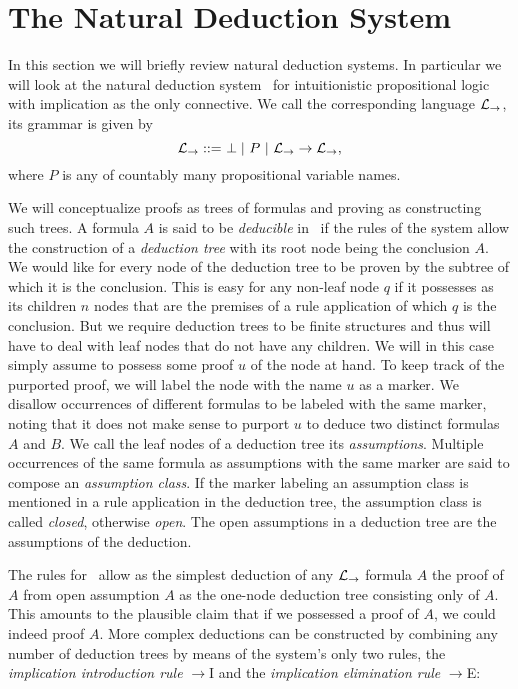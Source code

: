 \section{The Natural Deduction System \implnpi}
\label{sec:naturaldeduction}


In this section we will briefly review natural deduction systems. In particular
we will look at the natural deduction system \implnpi\ for intuitionistic
propositional logic with implication as the only connective. We call the
corresponding language $\mathcal{L}_\to$, its grammar is given by
$$\mathcal{L}_\to ::=\ \perp |\ P\ |\ \mathcal{L}_\to \to \mathcal{L}_\to,$$
where $P$ is any of countably many propositional variable names.

We will conceptualize proofs as trees of formulas and proving as constructing
such trees. A formula $A$ is said to be \textit{deducible} in \implnpi\ if the
rules of the system allow the construction of a \textit{deduction tree} with its
root node being the conclusion $A$. We would like for every node of the
deduction tree to be proven by the subtree of which it is the conclusion. This
is easy for any non-leaf node $q$ if it possesses as its children $n$ nodes that
are the premises of a rule application of which $q$ is the conclusion. But we
require deduction trees to be finite structures and thus will have to deal with
leaf nodes that do not have any children. We will in this case simply assume to
possess some proof $u$ of the node at hand. To keep track of the purported
proof, we will label the node with the name $u$ as a marker. We disallow
occurrences of different formulas to be labeled with the same marker, noting
that it does not make sense to purport $u$ to deduce two distinct formulas $A$
and $B$. We call the leaf nodes of a deduction tree its \textit{assumptions}.
Multiple occurrences of the same formula as assumptions with the same marker are
said to compose an \textit{assumption class}. If the marker labeling an
assumption class is mentioned in a rule application in the deduction tree, the
assumption class is called \textit{closed}, otherwise \textit{open}. The open
assumptions in a deduction tree are the assumptions of the deduction.

The rules for \implnpi\ allow as the simplest deduction of any $\mathcal{L}_\to$ formula
$A$ the proof of $A$ from open assumption $A$ as the one-node deduction tree
consisting only of $A$. This amounts to the plausible claim that if we possessed
a proof of $A$, we could indeed proof $A$. More complex deductions can be
constructed by combining any number of deduction trees by means of the system's
only two rules, the \textit{implication introduction rule} $\to$I and the
\textit{implication elimination rule} $\to$E:

